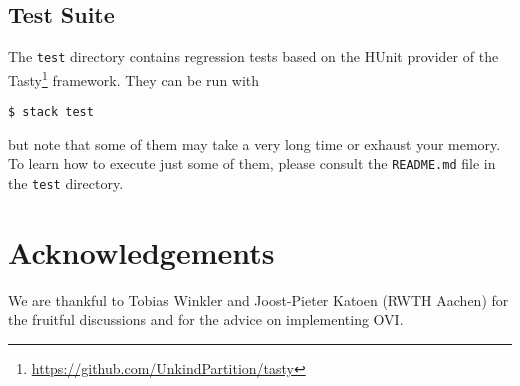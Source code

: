 \documentclass[9pt,a4paper]{article}
\begin{document}
\subsection{Test Suite}
The \texttt{test} directory contains regression tests based on the HUnit
provider of the Tasty\footnote{\url{https://github.com/UnkindPartition/tasty}} framework.
They can be run with
\begin{verbatim}
$ stack test
\end{verbatim}
but note that some of them may take a very long time or exhaust your memory.
To learn how to execute just some of them, please consult the \texttt{README.md}
file in the \texttt{test} directory.

\section*{Acknowledgements}
We are thankful to Tobias Winkler and Joost-Pieter Katoen (RWTH Aachen)
for the fruitful discussions and for the advice on implementing OVI.




\appendix
\end{document}
